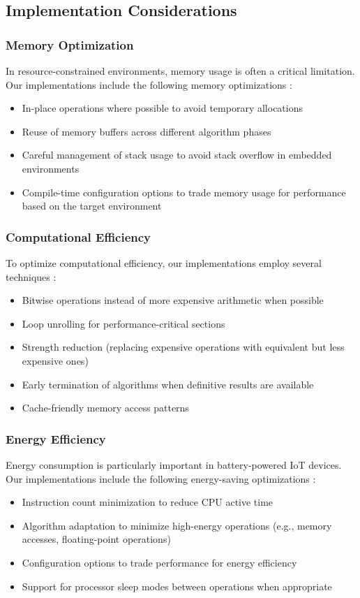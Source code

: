\subsection{Implementation Considerations}

\subsubsection{Memory Optimization}
In resource-constrained environments, memory usage is often a critical limitation. Our implementations include the following memory optimizations \cite{iot_survey}:
\begin{itemize}
    \item In-place operations where possible to avoid temporary allocations
    \item Reuse of memory buffers across different algorithm phases
    \item Careful management of stack usage to avoid stack overflow in embedded environments
    \item Compile-time configuration options to trade memory usage for performance based on the target environment
\end{itemize}

\subsubsection{Computational Efficiency}
To optimize computational efficiency, our implementations employ several techniques \cite{energy_efficient}:
\begin{itemize}
    \item Bitwise operations instead of more expensive arithmetic when possible
    \item Loop unrolling for performance-critical sections
    \item Strength reduction (replacing expensive operations with equivalent but less expensive ones)
    \item Early termination of algorithms when definitive results are available
    \item Cache-friendly memory access patterns
\end{itemize}

\subsubsection{Energy Efficiency}
Energy consumption is particularly important in battery-powered IoT devices. Our implementations include the following energy-saving optimizations \cite{energy_efficient}:
\begin{itemize}
    \item Instruction count minimization to reduce CPU active time
    \item Algorithm adaptation to minimize high-energy operations (e.g., memory accesses, floating-point operations)
    \item Configuration options to trade performance for energy efficiency
    \item Support for processor sleep modes between operations when appropriate
\end{itemize}

